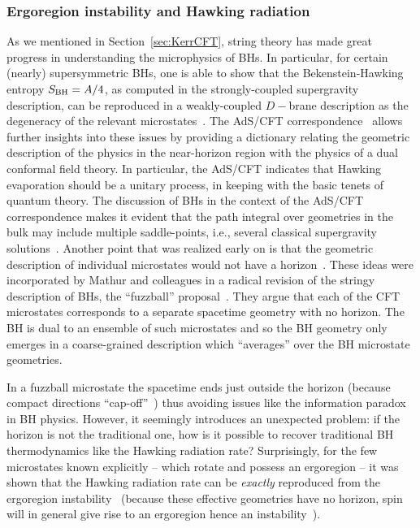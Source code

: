 \documentclass[11pt]{article}
\numberwithin{equation}{section} %
\begin{document}
\subsubsection{Ergoregion instability and Hawking radiation}
As we mentioned in Section~\ref{sec:KerrCFT}, string theory has made great progress in understanding the microphysics of BHs. In particular, for certain (nearly) supersymmetric BHs, one is able to show that the Bekenstein-Hawking entropy $S_{\rm BH} = A/4$, as
computed in the strongly-coupled supergravity description, can be reproduced in a weakly-coupled $D-$brane description
as the degeneracy of the relevant microstates~\cite{Strominger:1996sh}. The AdS/CFT correspondence~\cite{Maldacena:1997re,Gubser:1998bc,Witten:1998qj} allows
further insights into these issues by providing a dictionary relating the geometric description of the physics in the near-horizon
region with the physics of a dual conformal field theory. In particular, the AdS/CFT
indicates that Hawking evaporation should be a unitary process, in keeping with the basic tenets of quantum theory.
The discussion of BHs in the context of the AdS/CFT correspondence makes it evident that the path integral
over geometries in the bulk may include multiple saddle-points, i.e., several classical supergravity solutions~\cite{Witten:1998zw}. Another point that was realized early on is that the geometric description of individual microstates would not have a horizon~\cite{Myers:1997qi}. These ideas were incorporated by Mathur and colleagues in a radical revision of the stringy description
of BHs, the ``fuzzball'' proposal~\cite{Mathur:2005zp,Mathur:2014nja}. They argue that each of the CFT microstates corresponds to a separate spacetime geometry with no horizon. The BH is dual to an ensemble of such microstates and so the BH geometry only emerges in a coarse-grained description which ``averages'' over the BH microstate geometries.

In a fuzzball microstate the spacetime ends just outside the horizon (because compact directions ``cap-off''~\cite{Mathur:2014nja})
thus avoiding issues like the information paradox in BH physics. However, it seemingly introduces an unexpected problem: if the horizon is 
not the traditional one, how is it possible to recover traditional BH thermodynamics like the Hawking radiation rate?
Surprisingly, for the few microstates known explicitly -- which rotate and possess an ergoregion -- it was shown that the Hawking radiation rate can be {\it exactly} reproduced from the ergoregion instability~\cite{Chowdhury:2007jx,Chowdhury:2008bd} (because these effective geometries have no horizon, spin will in general give rise to an ergoregion hence an instability~\cite{Cardoso:2005gj}).
\end{document}
